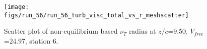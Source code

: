\begin{figure}[H]
\centering
\texttt{[image: figs/run\_56/run\_56\_turb\_visc\_total\_vs\_r\_meshscatter]}
\caption{Scatter plot of non-equilibrium based $\nu_T$ radius at $z/c$=9.50, $V_{free}$=24.97, station 6.}
\label{fig:run_56_turb_visc_total_vs_r_meshscatter}
\end{figure}


